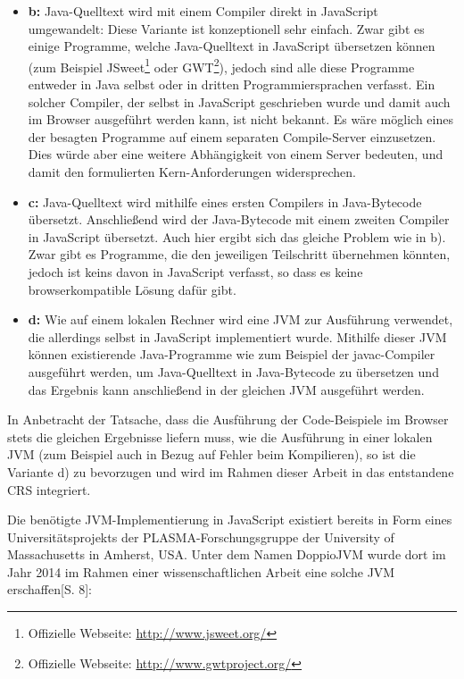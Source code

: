 \begin{itemize}
    \item \textbf{b:} Java-Quelltext wird mit einem Compiler direkt in JavaScript umgewandelt: Diese Variante ist konzeptionell sehr einfach. Zwar gibt es einige Programme, welche Java-Quelltext in JavaScript übersetzen können (zum Beispiel JSweet\footnote{Offizielle Webseite: \url{http://www.jsweet.org/}} oder GWT\footnote{Offizielle Webseite: \url{http://www.gwtproject.org/}}), jedoch sind alle diese Programme entweder in Java selbst oder in dritten Programmiersprachen verfasst. Ein solcher Compiler, der selbst in JavaScript geschrieben wurde und damit auch im Browser ausgeführt werden kann, ist nicht bekannt. Es wäre möglich eines der besagten Programme auf einem separaten Compile-Server einzusetzen. Dies würde aber eine weitere Abhängigkeit von einem Server bedeuten, und damit den formulierten Kern-Anforderungen widersprechen.
    \item \textbf{c:} Java-Quelltext wird mithilfe eines ersten Compilers in Java-Bytecode übersetzt. Anschließend wird der Java-Bytecode mit einem zweiten Compiler in JavaScript übersetzt. Auch hier ergibt sich das gleiche Problem wie in b). Zwar gibt es Programme, die den jeweiligen Teilschritt übernehmen könnten, jedoch ist keins davon in JavaScript verfasst, so dass es keine browserkompatible Lösung dafür gibt.
    \item \textbf{d:} Wie auf einem lokalen Rechner wird eine JVM zur Ausführung verwendet, die allerdings selbst in JavaScript implementiert wurde. Mithilfe dieser JVM können existierende Java-Programme wie zum Beispiel der javac-Compiler ausgeführt werden, um Java-Quelltext in Java-Bytecode zu übersetzen und das Ergebnis kann anschließend in der gleichen JVM ausgeführt werden.
\end{itemize}

In Anbetracht der Tatsache, dass die Ausführung der Code-Beispiele im Browser stets die gleichen Ergebnisse liefern muss, wie die Ausführung in einer lokalen JVM (zum Beispiel auch in Bezug auf Fehler beim Kompilieren), so ist die Variante d) zu bevorzugen und wird im Rahmen dieser Arbeit in das entstandene CRS integriert.

Die benötigte JVM-Implementierung in JavaScript existiert bereits in Form eines Universitätsprojekts der PLASMA-Forschungsgruppe der University of Massachusetts in Amherst, USA. Unter dem Namen DoppioJVM wurde dort im Jahr 2014 im Rahmen einer wissenschaftlichen Arbeit eine solche JVM erschaffen\cite{paper:doppio}[S. 8]:

